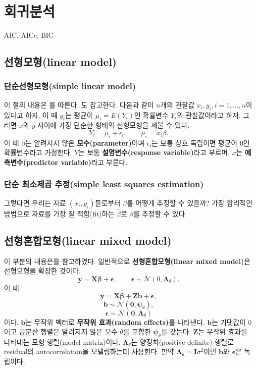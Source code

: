 \documentclass[b5paper,]{scrbook}
\theoremstyle{plain}
\theoremstyle{definition}
\numberwithin{equation}{section}
\begin{document}
\chapter{회귀분석}\label{reg}

AIC, AICc, BIC

\section{선형모형(linear model)}\label{linear-model}

\subsection{단순선형모형(simple linear
model)}\label{simple-linear-model}

이 절의 내용은 \citep{Yee2015}를 따른다. \citep{Wood2006}도 참고한다.
다음과 같이 \(n\)개의 관찰값 \(x_{i},y_{i}, i=1,\ldots,n\)이 있다고
하자. 이 때 \(y_{i}\)는 평균이 \(\mu_{i}=E(Y_{i})\)인 확률변수
\(Y_{i}\)의 관찰값이라고 하자. 그러면 \(x\)와 \(y\) 사이에 가장 단순한
형태의 선형모형을 세울 수 있다.
\[Y_{i}=\mu_{i}+\epsilon_{i}, \qquad{\mu_{i}=x_{i}\beta}.\] 이 때
\(\beta\)는 알려지지 않은 \textbf{모수(parameter)}이며
\(\epsilon_{i}\)는 보통 상호 독립이면 평균이 0인 확률변수라고 가정한다.
\(Y\)는 보통 \textbf{설명변수(response variable)}라고 부르며, \(x\)는
\textbf{예측변수(predictor variable)}라고 부른다.

\subsection{단순 최소제곱 추정(simple least squares
estimation)}\label{--simple-least-squares-estimation}

그렇다면 우리는 자료 \((x_{i},y_{i})\)들로부터 \(\beta\)를 어떻게 추정할
수 있을까? 가장 합리적인 방법으로 자료를 가장 잘 적합(fit)하는
\(\hat{\beta}\)로 \(\beta\)를 추정할 수 있다.

\section{선형혼합모형(linear mixed model)}\label{linear-mixed-model}

이 부분의 내용은\citep{Wood2006}를 참고하였다. 일반적으로
\textbf{선형혼합모형(linear mixed model)}은 선형모형을 확장한 것이다.
\[\mathbf{y}=\mathbf{X}\boldsymbol{\beta}+\boldsymbol{\epsilon}, \qquad{\boldsymbol{\epsilon}\sim\mathcal{N}(0,\boldsymbol{\Lambda}_{\theta})}.\]
이 때
\[\mathbf{y}=\mathbf{X}\boldsymbol{\beta}+\mathbf{Zb}+\boldsymbol{\epsilon},\]
\[\mathbf{b}\sim\mathcal{N}(\mathbf{0},\boldsymbol{\psi}_{\theta}),\]
\[\boldsymbol{\epsilon}\sim\mathcal{N}(\mathbf{0},\boldsymbol{\Lambda}_{\theta})\]
이다. \(\mathbf{b}\)는 무작위 벡터로 \textbf{무작위 효과(random
effects)}를 나타낸다. \(\mathbf{b}\)는 기댓값이 0이고 공분산 행렬은
알려지지 않은 모수 \(\theta\)를 포함한 \(\boldsymbol{\psi}_{\theta}\)를
갖는다. \(\mathbf{Z}\)는 무작위 효과를 나타내는 모형 행렬(model
matrix)이다. \(\boldsymbol{\Lambda}_{\theta}\)는 양정치(positive
definite) 행렬로 residual의 autocorrelation을 모델링하는데 사용한다.
만약 \(\boldsymbol{\Lambda}_{\theta}=\mathbf{I}\sigma^{2}\)이면
\(\mathbf{b}\)와 \(\boldsymbol{\epsilon}\)은 독립이다.
\end{document}

